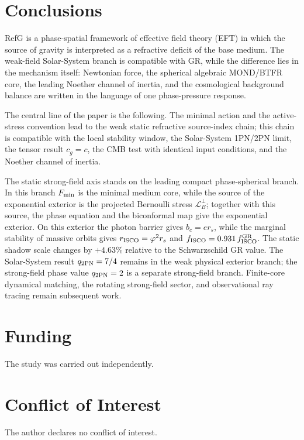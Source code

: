\documentclass[12pt]{article}
\begin{document}
\section{Conclusions}

RefG is a phase-spatial framework of effective field theory (EFT) in which the source of gravity is interpreted as a refractive deficit of the base medium. The weak-field Solar-System branch is compatible with GR, while the difference lies in the mechanism itself: Newtonian force, the spherical algebraic MOND/BTFR core, the leading Noether channel of inertia, and the cosmological background balance are written in the language of one phase-pressure response.

The central line of the paper is the following. The minimal action and the active-stress convention lead to the weak static refractive source-index chain; this chain is compatible with the local stability window, the Solar-System 1PN/2PN limit, the tensor result $c_g=c$, the CMB test with identical input conditions, and the Noether channel of inertia.

The static strong-field axis stands on the leading compact phase-spherical branch. In this branch $F_{\rm min}$ is the minimal medium core, while the source of the exponential exterior is the projected Bernoulli stress $\mathcal L_B^\perp$; together with this source, the phase equation and the biconformal map give the exponential exterior. On this exterior the photon barrier gives $b_c=e r_s$, while the marginal stability of massive orbits gives $r_{\rm ISCO}=\varphi^2r_s$ and $f_{\rm ISCO}=0.931\,f_{\rm ISCO}^{\rm GR}$. The static shadow scale changes by $+4.63\%$ relative to the Schwarzschild GR value. The Solar-System result $q_{\rm 2PN}=7/4$ remains in the weak physical exterior branch; the strong-field phase value $q_{\rm 2PN}=2$ is a separate strong-field branch. Finite-core dynamical matching, the rotating strong-field sector, and observational ray tracing remain subsequent work.

\section{Funding}

The study was carried out independently.

\section{Conflict of Interest}

The author declares no conflict of interest.
\end{document}
